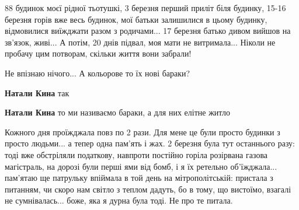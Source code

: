 
88 будинок моєї рідної тьотушкі, 3 березня перший приліт біля будинку, 15-16
березня горів вже весь будинок, мої батьки залишилися в цьому будинку,
відмовилися виїжджати разом з родичами... 17 березня батько дивом вийшов на
зв'язок, живі... А потім, 20 днів підвал, моя мати не витримала... Ніколи не
пробачу цим потворам, скільки життя вони забрали!


Не впізнаю нічого... А кольорове то їх нові бараки?

\begin{itemize} %
\textbf{Натали Кина} так

\textbf{Натали Кина} то ми називаємо бараки, а для них елітне житло
\end{itemize} %


Кожного дня проїжджала повз по 2 рази. Для мене це були просто будинки з просто
людьми... а тепер одна пам'ять і жах. 2 березня була тут останнього разу: тоді
вже обстріляли податкову, навпроти постійно горіла розірвана газова магістраль,
на дорозі були перші ями від бомб, і я їх ретельно об'їжджала... пам'ятаю ще
патрульку впіймала в той день на мітрополітській: пристала з питанням, чи скоро
нам світло з теплом дадуть, бо в тому, що вистоїмо, взагалі не сумнівалась...
боже, яка я дурна була тоді. Не про те питала.

